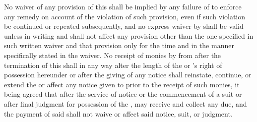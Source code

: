 No waiver of any provision of this \lease shall be implied by any failure of \lessor to enforce any remedy on account of the violation of such provision, even if such violation be continued or repeated subsequently, and no express waiver by \lessor shall be valid unless in writing and shall not affect any provision other than the one specified in such written waiver and that provision only for the time and in the manner specifically stated in the waiver. No receipt of monies by \lessor from \lessee after the termination of this \lease shall in any way alter the length of the \termOfLease or \lessee's right of possession hereunder or after the giving of any notice shall reinstate, continue, or extend the \termOfLease or affect any notice given to \lessee prior to the receipt of such monies, it being agreed that after the service of notice or the commencement of a suit or after final judgment for possession of the \premises, \lessor may receive and collect any \monthlyRent due, and the payment of said \monthlyRent shall not waive or affect said notice, suit, or judgment.
